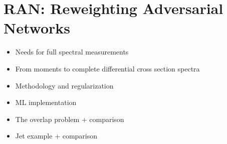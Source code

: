 \chapter{RAN: Reweighting Adversarial Networks}
\label{chap:ran}
\begin{itemize}
    \item Needs for full spectral measurements
    \item From moments to complete differential cross section spectra
    \item Methodology and regularization
    \item ML implementation
    \item The overlap problem + comparison
    \item Jet example + comparison
\end{itemize}